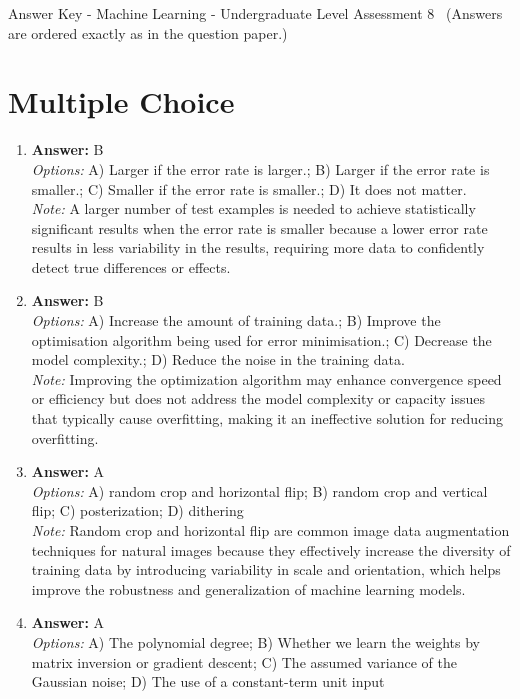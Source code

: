 \documentclass[12pt]{article}
\begin{document}
\begin{center}
Answer Key - Machine Learning - Undergraduate Level Assessment 8 \
\small (Answers are ordered exactly as in the question paper.)
\end{center}

\section*{Multiple Choice}
\begin{enumerate}[label=\arabic*.]
\item \textbf{Answer:} B
\\ \textit{Options:} A) Larger if the error rate is larger.; B) Larger if the error rate is smaller.; C) Smaller if the error rate is smaller.; D) It does not matter.
\\ \textit{Note:} A larger number of test examples is needed to achieve statistically significant results when the error rate is smaller because a lower error rate results in less variability in the results, requiring more data to confidently detect true differences or effects.
\item \textbf{Answer:} B
\\ \textit{Options:} A) Increase the amount of training data.; B) Improve the optimisation algorithm being used for error minimisation.; C) Decrease the model complexity.; D) Reduce the noise in the training data.
\\ \textit{Note:} Improving the optimization algorithm may enhance convergence speed or efficiency but does not address the model complexity or capacity issues that typically cause overfitting, making it an ineffective solution for reducing overfitting.
\item \textbf{Answer:} A
\\ \textit{Options:} A) random crop and horizontal flip; B) random crop and vertical flip; C) posterization; D) dithering
\\ \textit{Note:} Random crop and horizontal flip are common image data augmentation techniques for natural images because they effectively increase the diversity of training data by introducing variability in scale and orientation, which helps improve the robustness and generalization of machine learning models.
\item \textbf{Answer:} A
\\ \textit{Options:} A) The polynomial degree; B) Whether we learn the weights by matrix inversion or gradient descent; C) The assumed variance of the Gaussian noise; D) The use of a constant-term unit input

\end{enumerate}
\end{document}
